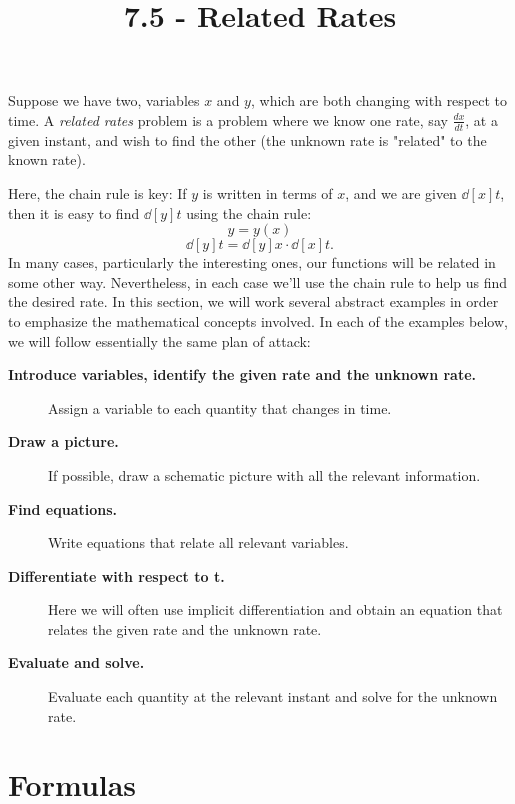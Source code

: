 \documentclass{ximera}
\title{7.5 - Related Rates}
\begin{document}
	\begin{abstract}

	\end{abstract}
	\maketitle
	
	
	Suppose we have two, variables $x$ and $y$, which are both changing with
	respect to time.  A \textit{related rates} problem is a problem where
	we know one rate, say $\frac{dx}{dt}$, at a given instant, and wish to find the other (the unknown rate is "related" to the known rate).
	
	Here, the chain rule is key: If $y$ is written in terms of $x$, and we
	are given $\dd[x]{t}$, then it is easy to find $\dd[y]{t}$ using the
	chain rule:
	\[
	y=y(x)
	\]
	\[
	\dd[y]{t}=\dd[y]{x}\cdot \dd[x]{t}.
	\]
	In many cases, particularly the interesting ones, our functions will
	be related in some other way. Nevertheless, in each case we'll use the
	chain rule to help us find the desired rate. In this
	section, we will work several abstract examples in order to emphasize
	the mathematical concepts involved. In each of the examples below, we
	will follow essentially the same plan of attack:
	
	
	
	\begin{description}
		\item[\textbf{Introduce variables, identify the given rate and the unknown rate.}]
		
		Assign a variable to each quantity that changes in time.
		\item[\textbf{Draw a picture.}] If possible, draw a schematic picture with all the relevant information. 
		\item[\textbf{Find equations.}] Write equations that relate all
		relevant variables.
		\item[\textbf{Differentiate with respect to t.}] Here we will often use
		implicit differentiation and obtain an equation that relates the given rate and the unknown rate. 
		\item[\textbf{Evaluate and solve.}] Evaluate
		each quantity at the relevant instant and solve for the unknown rate.
		
	\end{description}
	
	
	
	
	\section{Formulas}
	
\end{document}
